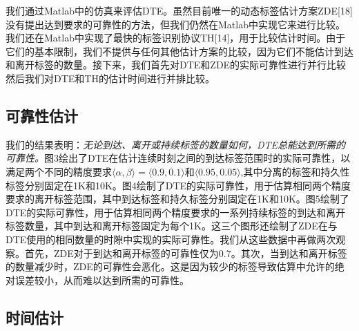 \documentclass[UTF8]{ctexart}
\begin{document}
	我们通过Matlab中的仿真来评估DTE。虽然目前唯一的动态标签估计方案ZDE[18]没有提出达到要求的可靠性的方法，但我们仍然在Matlab中实现它来进行比较。我们还在Matlab中实现了最快的标签识别协议TH[14]，用于比较估计时间。由于它们的基本限制，我们不提供与任何其他估计方案的比较，因为它们不能估计到达和离开标签的数量。接下来，我们首先对DTE和ZDE的实际可靠性进行并行比较 然后我们对DTE和TH的估计时间进行并排比较。
	
	\subsection{可靠性估计}
	
	我们的结果表明：\emph{无论到达、离开或持续标签的数量如何，DTE总能达到所需的可靠性。}图3绘出了DTE在估计连续时刻之间的到达标签范围时的实际可靠性，以满足两个不同的精度要求$\langle\alpha,\beta\rangle = \langle 0.9,0.1\rangle$和$\langle 0.95,0.05\rangle$,其中分离的标签和持久性标签分别固定在1K和10K。图4绘制了DTE的实际可靠性，用于估算相同两个精度要求的离开标签范围，其中到达标签和持久标签分别固定在1K和10K。图5绘制了DTE的实际可靠性，用于估算相同两个精度要求的一系列持续标签的到达和离开标签数量，其中到达和离开标签固定为每个1K。这三个图形还绘制了ZDE在与DTE使用的相同数量的时隙中实现的实际可靠性。我们从这些数据中再做两次观察。首先，ZDE对于到达和离开标签的可靠性仅为0.7。其次，当到达和离开标签的数量减少时，ZDE的可靠性会恶化。这是因为较少的标签导致估算中允许的绝对误差较小，从而难以达到所需的可靠性。
	
	\subsection{时间估计}
	
\end{document}
